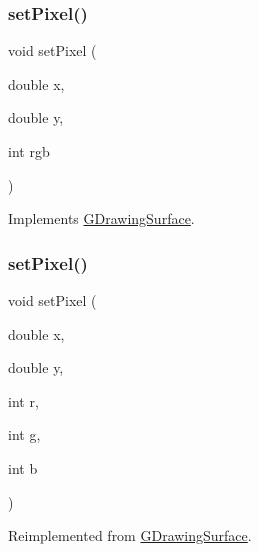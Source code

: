 \mbox{\label{classGForwardDrawingSurface_a1fd61df1d79ebf3db7935d5c38c222e5}} 
\subsubsection{\texorpdfstring{set\+Pixel()}{setPixel()}\hspace{0.1cm}{\footnotesize\ttfamily [2/3]}}
{\footnotesize\ttfamily void set\+Pixel (\begin{DoxyParamCaption}\item[{double}]{x,  }\item[{double}]{y,  }\item[{int}]{rgb }\end{DoxyParamCaption})\hspace{0.3cm}{\ttfamily [virtual]}}



Implements \mbox{\hyperlink{classGDrawingSurface_ac9f0a75ccb0abe1123046bab56479b84}{G\+Drawing\+Surface}}.

\mbox{\label{classGForwardDrawingSurface_af9aca140f86a6de6a4368d41349dd57c}} 
\subsubsection{\texorpdfstring{set\+Pixel()}{setPixel()}\hspace{0.1cm}{\footnotesize\ttfamily [3/3]}}
{\footnotesize\ttfamily void set\+Pixel (\begin{DoxyParamCaption}\item[{double}]{x,  }\item[{double}]{y,  }\item[{int}]{r,  }\item[{int}]{g,  }\item[{int}]{b }\end{DoxyParamCaption})\hspace{0.3cm}{\ttfamily [virtual]}}



Reimplemented from \mbox{\hyperlink{classGDrawingSurface_aec90e927c9da286214908d3f9da685d7}{G\+Drawing\+Surface}}.

